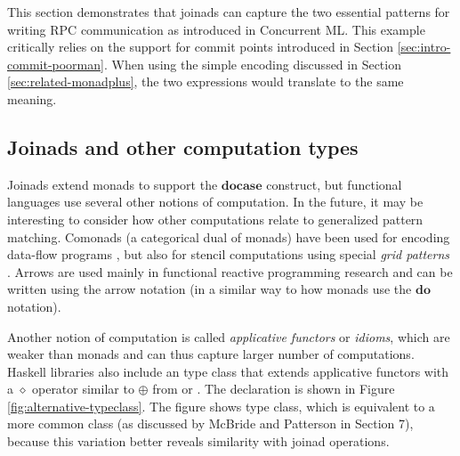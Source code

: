 \documentclass{sigplanconf}
\begin{document}
This section demonstrates that joinads can capture the two essential patterns for writing RPC
communication as introduced in Concurrent ML. This example critically relies on the support for
commit points introduced in Section \ref{sec:intro-commit-poorman}. When using the simple encoding
discussed in Section \ref{sec:related-monadplus}, the two expressions would translate to the 
same meaning.


\subsection{Joinads and other computation types}
Joinads extend monads to support the \ensuremath{\mathbf{docase}} construct, but functional languages use several other
notions of computation. In the future, it may be interesting to consider how other computations
relate to generalized pattern matching. Comonads (a categorical dual of monads) \cite{comonads-codata} 
have been used for encoding data-flow programs \cite{comonads-dataflow}, but also for stencil 
computations using special \textit{grid patterns} \cite{comomads-ypnos}. Arrows 
\cite{generalisingmonads, causalarr} are used mainly in functional reactive programming research 
\cite{arrows-frp} and can be written using the arrow notation \cite{arrows-notation} (in a similar 
way to how monads use the \ensuremath{\mathbf{do}} notation).

Another notion of computation is called \textit{applicative functors} \cite{applicative} or 
\textit{idioms}, which are weaker than monads and can thus capture larger number of computations. 
Haskell libraries also include an  type class that extends applicative functors 
with a \ensuremath{\diamond} operator similar to \ensuremath{\oplus} from  or . The 
declaration is shown in Figure \ref{fig:alternative-typeclass}. The figure shows  type
class, which is equivalent to a more common  class (as discussed by McBride and 
Patterson \cite{applicative} in Section 7), because this variation better reveals similarity with
joinad operations.
\end{document}
